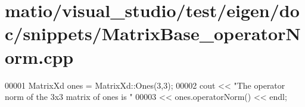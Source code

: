 \hypertarget{matio_2visual__studio_2test_2eigen_2doc_2snippets_2_matrix_base__operator_norm_8cpp_source}{}\section{matio/visual\+\_\+studio/test/eigen/doc/snippets/\+Matrix\+Base\+\_\+operator\+Norm.cpp}
\label{matio_2visual__studio_2test_2eigen_2doc_2snippets_2_matrix_base__operator_norm_8cpp_source}

\begin{DoxyCode}
00001 MatrixXd ones = MatrixXd::Ones(3,3);
00002 cout << \textcolor{stringliteral}{"The operator norm of the 3x3 matrix of ones is "}
00003      << ones.operatorNorm() << endl;
\end{DoxyCode}
